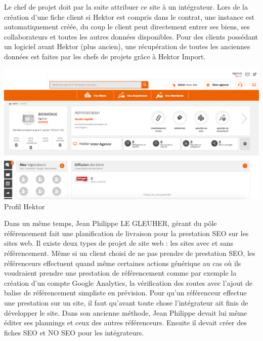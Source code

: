 \documentclass[12pt]{article}
\begin{document}
\newpage

Le chef de projet doit par la suite attribuer ce site à un intégrateur.\newline
Lors de la création d'une fiche client si Hektor est compris dans le contrat, une instance est automatiquement créée, du coup le client peut directement entrer ses biens, ses collaborateurs et toutes les autres données disponibles. \newline 
Pour des clients possédant un logiciel avant Hektor (plus ancien), une récupération de toutes les anciennes données est faites par les chefs de projets grâce à Hektor Import.

\vspace{0.5cm}

\begin{center} 
\includegraphics[scale = 0.4]{hektor_vide.png}\hfill
Profil Hektor
\end{center}
\vspace{0.5cm}

Dans un même temps, Jean Philippe LE GLEUHER, gérant du pôle référencement fait  une planification de livraison pour la prestation SEO sur les sites web. \newline
Il existe deux types de projet de site web : les sites avec et sans référencement. Même si un client choisi de ne pas prendre de prestation SEO, les référenceurs effectuent quand même certaines actions générique au cas où ils voudraient prendre une prestation de référencement comme par exemple la création d'un compte Google Analytics, la vérification des routes avec l'ajout de balise de référencement simpliste en prévision.
Pour qu'un référenceur effectue une prestation sur un site, il faut qu'avant toute chose l'intégrateur ait finis de développer le site.\newline
\newpage
Dans son ancienne méthode, Jean Philippe devait lui même éditer ses plannings et ceux des autres référenceurs. Ensuite il devait créer des fiches SEO et NO SEO pour les intégrateurs.
\end{document}
